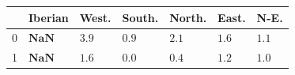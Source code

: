 \begin{tabular}{l}
\toprule
 & Iberian & West. & South. & North. & East. & N-E. \\
 & $\mathbf{NaN}$ & $\mathbf{3.9}$ & ${0.9}$ & $\mathbf{2.1}$ & $\mathbf{1.6}$ & ${1.1}$ \\
1 & $\mathbf{NaN}$ & ${1.6}$ & ${0.0}$ & $\mathbf{0.4}$ & ${1.2}$ & ${1.0}$ \\
\bottomrule
\end{tabular}
